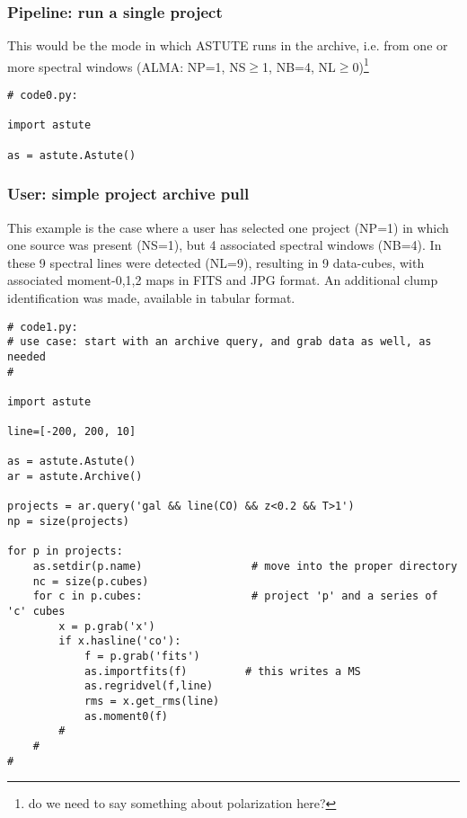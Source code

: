 \documentclass[preprint]{aastex} %
\begin{document}
\subsubsection{Pipeline: run a single project}

This would be the mode in which ASTUTE runs in the archive, i.e. from one or more spectral
windows (ALMA: NP=1, NS$\ge$1, NB=4, NL$\ge$0)\footnote{do we need to say something about 
polarization here?}

\footnotesize
\begin{verbatim}
# code0.py:

import astute

as = astute.Astute()

\end{verbatim}
\normalsize


\subsubsection{User: simple project archive pull}

This example is the case where a user has selected one project (NP=1)
in which one source was present (NS=1), but 4 associated 
spectral windows (NB=4). In these 9 spectral lines were detected (NL=9),
resulting in 9 data-cubes, with associated moment-0,1,2 maps in FITS
and JPG format. An additional clump identification was made, available
in tabular format.

\footnotesize
\begin{verbatim}
# code1.py:
# use case: start with an archive query, and grab data as well, as needed
#

import astute

line=[-200, 200, 10]

as = astute.Astute()
ar = astute.Archive()

projects = ar.query('gal && line(CO) && z<0.2 && T>1')
np = size(projects)

for p in projects:
    as.setdir(p.name)                 # move into the proper directory
    nc = size(p.cubes)
    for c in p.cubes:                 # project 'p' and a series of 'c' cubes
        x = p.grab('x')
        if x.hasline('co'):
            f = p.grab('fits')
            as.importfits(f)         # this writes a MS
            as.regridvel(f,line)
            rms = x.get_rms(line)
            as.moment0(f)
        #
    #
#

\end{verbatim}
\normalsize
\end{document}
